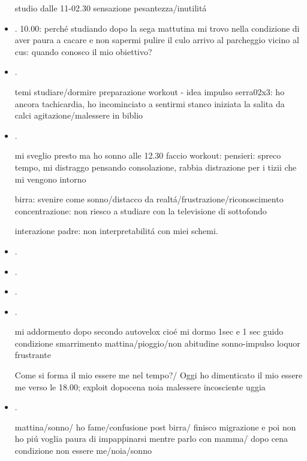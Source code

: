 \begin{itemize}
studio dalle 11-02.30 sensazione pesantezza/inutilit\'a

\item {}.
10.00: perch\'e studiando dopo la sega mattutina mi trovo nella condizione di aver paura a cacare e non sapermi pulire il culo
arrivo al parcheggio vicino al cus: quando conosco il mio obiettivo?

\item {}.

temi
studiare/dormire
preparazione workout - idea impulso
serra02x3: ho ancora tachicardia, ho incominciato a sentirmi stanco iniziata la salita da calci
agitazione/malessere in biblio

\item {}.

mi sveglio presto ma ho sonno alle 12.30 faccio workout: 
pensieri: spreco tempo, mi distraggo pensando consolazione, rabbia distrazione per i tizii che mi vengono intorno

birra: svenire come sonno/distacco da realt\'a/frustrazione/riconoscimento
concentrazione: non riesco a studiare con la televisione di sottofondo

interazione padre: non interpretabilit\'a con miei schemi.

\item {}.



\item {}.

\item {}.
 
\item {}.

mi addormento dopo secondo autovelox cio\'e mi dormo 1sec e 1 sec guido
condizione smarrimento mattina/pioggio/non abitudine
sonno-impulso loquor frustrante

Come si forma il mio essere me nel tempo?/ Oggi ho dimenticato il mio essere me verso le 18.00; exploit dopocena noia malessere incosciente uggia

\item {}.

mattina/sonno/
ho fame/confusione post birra/
finisco migrazione e poi non ho pi\'u voglia
paura di impappinarsi mentre parlo con mamma/
dopo cena condizione non essere me/noia/sonno


\end{itemize}
